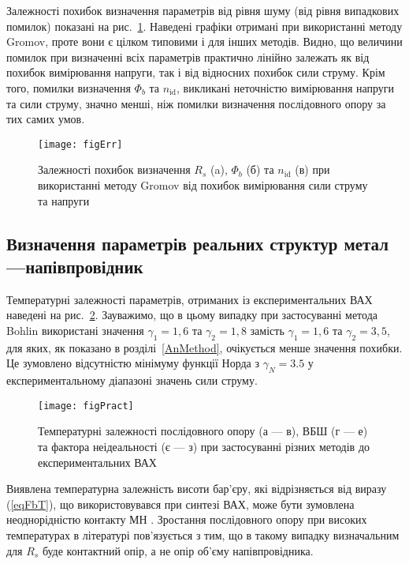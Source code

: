 Залежності похибок визначення параметрів від рівня шуму (від рівня випадкових помилок) показані на рис.~\ref{figErr}.
Наведені графіки отримані при використанні методу Gromov, проте вони є цілком типовими і для інших методів.
Видно, що величини помилок при визначенні всіх параметрів практично лінійно залежать як від похибок вимірювання напруги, так і від відносних похибок сили струму.
Крім того, помилки визначення $\Phi_b$ та $n_\mathrm{id}$, викликані неточністю вимірювання напруги та сили струму, значно менші, ніж помилки визначення послідовного опору за тих самих умов.


\begin{figure}
\texttt{[image: figErr]}%
\caption{\label{figErr}
Залежності похибок визначення $R_s$ (a), $\Phi_b$ (б) та $n_\mathrm{id}$ (в) при використанні методу Gromov  від похибок вимірювання сили струму та напруги
}
\end{figure}


\subsection{Визначення параметрів реальних структур метал---напівпровідник}

Температурні залежності параметрів, отриманих із експериментальних ВАХ наведені на рис.~\ref{figPract}.
Зауважимо, що в цьому випадку при застосуванні метода Bohlin використані значення $\gamma_1=1,6$ та $\gamma_2=1,8$ замість  $\gamma_1=1,6$ та $\gamma_2=3,5$, для яких, як показано в розділі~\ref{AnMethod}, очікується менше значення похибки.
Це зумовлено відсутністю мінімуму функції Норда з $\gamma_N=3.5$ у експериментальному діапазоні значень сили струму.



\begin{figure}
\center
\texttt{[image: figPract]}%
\caption{\label{figPract}
Температурні залежності послідовного опору (а --- в), ВБШ (г --- е) та фактора неідеальності (є --- з) при
застосуванні різних методів до експериментальних ВАХ
}
\end{figure}

Виявлена температурна залежність висоти бар'єру, які відрізняється від виразу (\ref{eqFbT}), що використовувався при синтезі ВАХ, може бути зумовлена неоднорідністю контакту МН \cite{Tung:MSE,Olikh:2013IEEE}.
Зростання послідовного опору при високих температурах в літературі \cite{Rs:Dokme} пов'язується з тим, що в такому випадку визначальним для $R_s$ буде контактний опір, а не опір об'єму напівпровідника.

